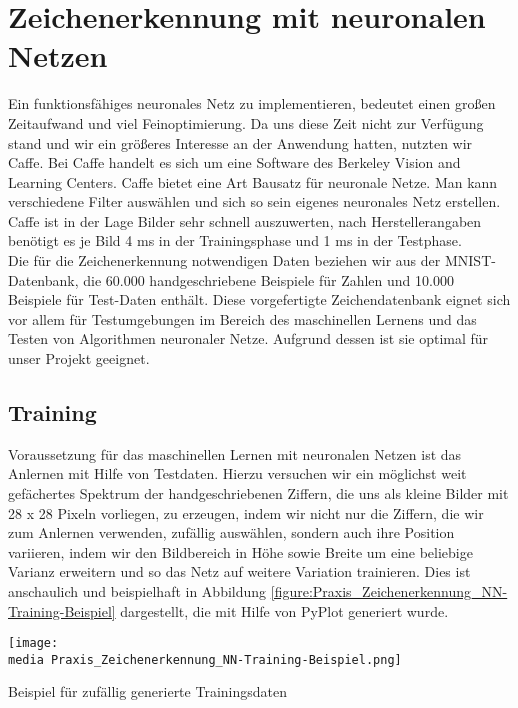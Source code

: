 \section{Zeichenerkennung mit neuronalen Netzen}

Ein funktionsfähiges neuronales Netz zu implementieren, bedeutet einen großen Zeitaufwand und viel Feinoptimierung. Da uns diese Zeit nicht zur Verfügung stand und wir ein größeres Interesse an der Anwendung hatten, nutzten wir Caffe. Bei Caffe handelt es sich um eine Software des Berkeley Vision and Learning Centers. Caffe bietet eine Art Bausatz für neuronale Netze. Man kann verschiedene Filter auswählen und sich so sein eigenes neuronales Netz erstellen. Caffe ist in der Lage Bilder sehr schnell auszuwerten, nach Herstellerangaben benötigt es je Bild 4 ms in der Trainingsphase und 1 ms in der Testphase. \\
Die für die Zeichenerkennung notwendigen Daten beziehen wir aus der MNIST-Datenbank, die 60.000 handgeschriebene Beispiele für Zahlen und 10.000 Beispiele für Test-Daten enthält. Diese vorgefertigte Zeichendatenbank eignet sich vor allem für Testumgebungen im Bereich des maschinellen Lernens und das Testen von Algorithmen neuronaler Netze. Aufgrund dessen ist sie optimal für unser Projekt geeignet.

\subsection{Training}
Voraussetzung für das maschinellen Lernen mit neuronalen Netzen ist das Anlernen mit Hilfe von Testdaten. Hierzu versuchen wir ein möglichst weit gefächertes Spektrum der handgeschriebenen Ziffern, die uns als kleine Bilder mit 28 x 28 Pixeln vorliegen, zu erzeugen, indem wir nicht nur die Ziffern, die wir zum Anlernen verwenden, zufällig auswählen, sondern auch ihre Position variieren, indem wir den Bildbereich in Höhe sowie Breite um eine beliebige Varianz erweitern und so das Netz auf weitere Variation trainieren. Dies ist anschaulich und beispielhaft in Abbildung \ref{figure:Praxis_Zeichenerkennung_NN-Training-Beispiel} dargestellt, die mit Hilfe von PyPlot generiert wurde.\\

\begin{dsafigure}
\begin{center}
\texttt{[image: \\media Praxis\_Zeichenerkennung\_NN-Training-Beispiel.png]}
\label{figure:Praxis_Zeichenerkennung_NN-Training-Beispiel}
\caption{Beispiel für zufällig generierte Trainingsdaten}
\end{center}
\end{dsafigure}


